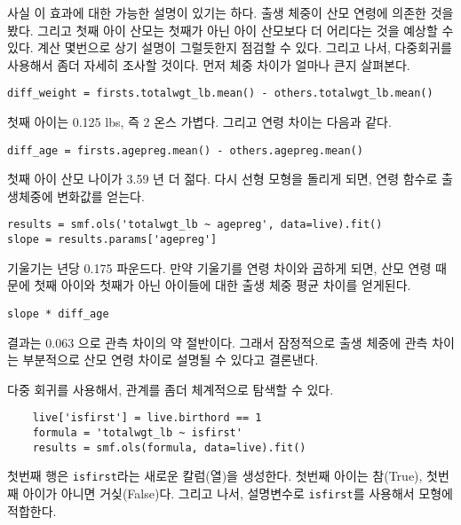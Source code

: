 사실 이 효과에 대한 가능한 설명이 있기는 하다. 출생 체중이 산모 연령에 의존한 것을 봤다. 그리고 첫째 아이 산모는 첫째가 아닌 아이 산모보다 더 어리다는 것을 예상할 수 있다.
계산 몇번으로 상기 설명이 그럴듯한지 점검할 수 있다.
그리고 나서, 다중회귀를 사용해서 좀더 자세히 조사할 것이다. 먼저 체중 차이가 얼마나 큰지 살펴본다.

\begin{verbatim}
diff_weight = firsts.totalwgt_lb.mean() - others.totalwgt_lb.mean()
\end{verbatim}

첫째 아이는 0.125 lbs, 즉 2 온스 가볍다. 그리고 연령 차이는 다음과 같다.

\begin{verbatim}
diff_age = firsts.agepreg.mean() - others.agepreg.mean()
\end{verbatim}

첫째 아이 산모 나이가 3.59 년 더 젊다.
다시 선형 모형을 돌리게 되면, 연령 함수로 출생체중에 변화값를 얻는다.

\begin{verbatim}
results = smf.ols('totalwgt_lb ~ agepreg', data=live).fit()
slope = results.params['agepreg']
\end{verbatim}

기울기는 년당 0.175 파운드다. 만약 기울기를 연령 차이와 곱하게 되면, 산모 연령 때문에 첫째 아이와 첫째가 아닌 아이들에 대한 출생 체중 평균 차이를 얻게된다. 

\begin{verbatim}
slope * diff_age
\end{verbatim}

결과는 0.063 으로 관측 차이의 약 절반이다. 
그래서 잠정적으로 출생 체중에 관측 차이는 부분적으로 산모 연령 차이로 설명될 수 있다고 결론낸다.

다중 회귀를 사용해서, 관계를 좀더 체계적으로 탐색할 수 있다.

\begin{verbatim}
    live['isfirst'] = live.birthord == 1
    formula = 'totalwgt_lb ~ isfirst'
    results = smf.ols(formula, data=live).fit()
\end{verbatim}

첫번째 행은 {\tt isfirst}라는 새로운 칼럼(열)을 생성한다. 첫번째 아이는 참(True), 첫번째 아이가 아니면 거싲(False)다. 그리고 나서, 설명변수로 {\tt isfirst}를 사용해서 모형에 적합한다.

